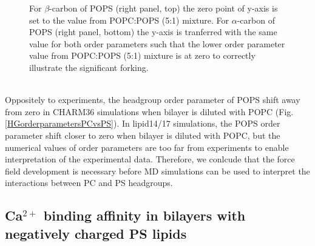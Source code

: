 \documentclass[aps,prl,superscriptaddress,twocolumn]{revtex4}
\begin{document}
\begin{figure}[]
{    For $\beta$-carbon of POPS (right panel, top) the zero point of y-axis is
    set to the value from POPC:POPS (5:1) mixture.
    For $\alpha$-carbon of POPS (right panel, bottom) the y-axis is tranferred
    with the same value for both order parameters such that the lower order
    parameter value from POPC:POPS (5:1) mixture is at zero
    to correctly illustrate the significant forking.
  }
   \\
   \\
\end{figure}

Oppositely to experiments, the headgroup order parameter of POPS shift away
from zero in CHARM36 simulations when bilayer is diluted with POPC (Fig. \ref{HGorderparametersPCvsPS}).
In lipid14/17 simulations, the POPS order parameter shift closer to zero when
bilayer is diluted with POPC, but the numerical values of order parameters
are too far from experiments to enable interpretation of the experimental data.
Therefore, we conlcude that the force field development is necessary before
MD simulations can be used to interpret the interactions between PC and PS headgroups.



\subsection{Ca$^{2+}$ binding affinity in bilayers with negatively charged PS lipids}
\end{document}
